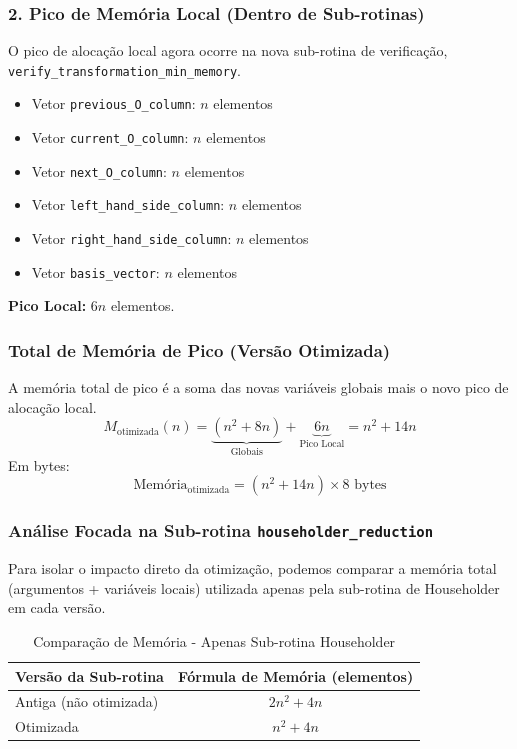 \documentclass[12pt, a4paper]{article} %
\begin{document}
            \subsubsection*{2. Pico de Mem\'oria Local (Dentro de Sub-rotinas)}
            O pico de aloca\c{c}\~ao local agora ocorre na nova sub-rotina de verifica\c{c}\~ao, \texttt{verify\_transformation\_min\_memory}.
            \begin{itemize}
                \item Vetor \texttt{previous\_O\_column}: $n$ elementos
                \item Vetor \texttt{current\_O\_column}: $n$ elementos
                \item Vetor \texttt{next\_O\_column}: $n$ elementos
                \item Vetor \texttt{left\_hand\_side\_column}: $n$ elementos
                \item Vetor \texttt{right\_hand\_side\_column}: $n$ elementos
                \item Vetor \texttt{basis\_vector}: $n$ elementos
            \end{itemize}
            \textbf{Pico Local:} $6n$ elementos.

            \subsubsection*{Total de Mem\'oria de Pico (Vers\~ao Otimizada)}
            A mem\'oria total de pico \'e a soma das novas vari\'aveis globais mais o novo pico de aloca\c{c}\~ao local.
            \[
            M_{\text{otimizada}}(n) = \underbrace{(n^2 + 8n)}_{\text{Globais}} + \underbrace{6n}_{\text{Pico Local}} = n^2 + 14n
            \]
            Em bytes:
            \[
            \text{Mem\'oria}_{\text{otimizada}} = (n^2 + 14n) \times 8 \text{ bytes}
            \]

            \subsubsection*{An\'alise Focada na Sub-rotina \texttt{householder\_reduction}}

                Para isolar o impacto direto da otimiza\c{c}\~ao, podemos comparar a mem\'oria total (argumentos + vari\'aveis locais) utilizada apenas pela sub-rotina de Householder em cada vers\~ao.

                \begin{table}[H]
                \centering
                \caption{Compara\c{c}\~ao de Mem\'oria - Apenas Sub-rotina Householder}
                \begin{tabular}{|l|c|}
                \hline
                \textbf{Vers\~ao da Sub-rotina} & \textbf{F\'ormula de Mem\'oria (elementos)} \\
                \hline
                Antiga (n\~ao otimizada) & $2n^2 + 4n$ \\
                Otimizada & $n^2 + 4n$ \\
                \hline
                \end{tabular}
                \end{table}
\end{document}
